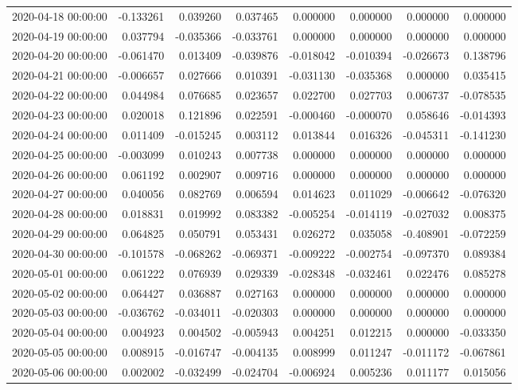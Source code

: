\begin{tabular}{lrrrrrrr}
2020-04-18 00:00:00 & -0.133261 & 0.039260 & 0.037465 & 0.000000 & 0.000000 & 0.000000 & 0.000000 \\
2020-04-19 00:00:00 & 0.037794 & -0.035366 & -0.033761 & 0.000000 & 0.000000 & 0.000000 & 0.000000 \\
2020-04-20 00:00:00 & -0.061470 & 0.013409 & -0.039876 & -0.018042 & -0.010394 & -0.026673 & 0.138796 \\
2020-04-21 00:00:00 & -0.006657 & 0.027666 & 0.010391 & -0.031130 & -0.035368 & 0.000000 & 0.035415 \\
2020-04-22 00:00:00 & 0.044984 & 0.076685 & 0.023657 & 0.022700 & 0.027703 & 0.006737 & -0.078535 \\
2020-04-23 00:00:00 & 0.020018 & 0.121896 & 0.022591 & -0.000460 & -0.000070 & 0.058646 & -0.014393 \\
2020-04-24 00:00:00 & 0.011409 & -0.015245 & 0.003112 & 0.013844 & 0.016326 & -0.045311 & -0.141230 \\
2020-04-25 00:00:00 & -0.003099 & 0.010243 & 0.007738 & 0.000000 & 0.000000 & 0.000000 & 0.000000 \\
2020-04-26 00:00:00 & 0.061192 & 0.002907 & 0.009716 & 0.000000 & 0.000000 & 0.000000 & 0.000000 \\
2020-04-27 00:00:00 & 0.040056 & 0.082769 & 0.006594 & 0.014623 & 0.011029 & -0.006642 & -0.076320 \\
2020-04-28 00:00:00 & 0.018831 & 0.019992 & 0.083382 & -0.005254 & -0.014119 & -0.027032 & 0.008375 \\
2020-04-29 00:00:00 & 0.064825 & 0.050791 & 0.053431 & 0.026272 & 0.035058 & -0.408901 & -0.072259 \\
2020-04-30 00:00:00 & -0.101578 & -0.068262 & -0.069371 & -0.009222 & -0.002754 & -0.097370 & 0.089384 \\
2020-05-01 00:00:00 & 0.061222 & 0.076939 & 0.029339 & -0.028348 & -0.032461 & 0.022476 & 0.085278 \\
2020-05-02 00:00:00 & 0.064427 & 0.036887 & 0.027163 & 0.000000 & 0.000000 & 0.000000 & 0.000000 \\
2020-05-03 00:00:00 & -0.036762 & -0.034011 & -0.020303 & 0.000000 & 0.000000 & 0.000000 & 0.000000 \\
2020-05-04 00:00:00 & 0.004923 & 0.004502 & -0.005943 & 0.004251 & 0.012215 & 0.000000 & -0.033350 \\
2020-05-05 00:00:00 & 0.008915 & -0.016747 & -0.004135 & 0.008999 & 0.011247 & -0.011172 & -0.067861 \\
2020-05-06 00:00:00 & 0.002002 & -0.032499 & -0.024704 & -0.006924 & 0.005236 & 0.011177 & 0.015056 \\

\end{tabular}
